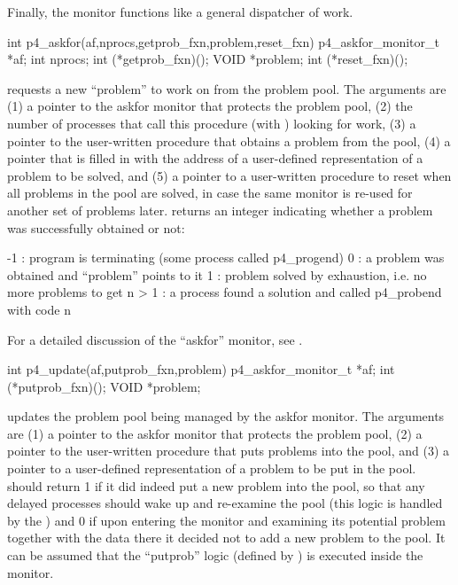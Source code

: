 Finally, the  monitor functions like a general dispatcher of
work. 

\begin{example}
int p4_askfor(af,nprocs,getprob_fxn,problem,reset_fxn)
p4_askfor_monitor_t *af;
int nprocs;
int (*getprob_fxn)();
VOID *problem;
int (*reset_fxn)();
\end{example}
\noindent
requests a new ``problem'' to work on from the problem pool.  The
arguments are (1) a pointer to the askfor monitor that protects the
problem pool, (2) the number of processes that call this procedure
(with ) looking for work, (3) a pointer to the user-written procedure
that obtains a problem from the pool, (4) a pointer that is filled in
with the address of a user-defined representation of a problem to be
solved, and (5) a pointer to a user-written procedure to reset when all
problems in the pool are solved, in case the same monitor is re-used
for another set of problems later.   returns an integer
indicating whether a problem was successfully obtained or not:

\begin{example}
  -1     : program is terminating (some process called p4_progend)
   0     : a problem was obtained and ``problem'' points to it
   1     : problem solved by exhaustion, i.e. no more problems to get
   n > 1 : a process found a solution and called p4_probend with code n
\end{example}
\noindent
For a detailed discussion of the ``askfor'' monitor, see
\cite{lusk-overbeek:p4-book}.

\begin{example}
int p4_update(af,putprob_fxn,problem)
p4_askfor_monitor_t *af;
int (*putprob_fxn)();
VOID *problem;
\end{example}
\noindent
updates the problem pool being managed by the askfor monitor.  The
arguments are (1) a pointer to the askfor monitor that protects the
problem pool, (2) a pointer to the user-written procedure that puts
problems into the pool, and (3) a pointer to a user-defined
representation of a problem to be put in the pool.  
should return 1 if it did indeed put a new problem into the pool, so
that any delayed processes should wake up and re-examine the pool (this
logic is handled by the ) and 0 if upon entering the
monitor and examining its potential problem together with the data there
it decided not to add a new problem to the pool.  It can be assumed that
the ``putprob'' logic (defined by ) is executed inside
the monitor.

